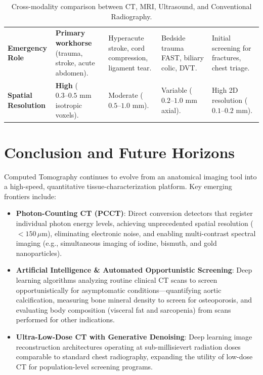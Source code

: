 \documentclass[11pt,a4paper]{article}
\begin{document}
\begin{table}[htbp]
\begin{tabular}{p{2.2cm}p{3.2cm}p{3.2cm}p{3.0cm}p{2.8cm}}
\textbf{Emergency Role} & \textbf{Primary workhorse} (trauma, stroke, acute abdomen). & Hyperacute stroke, cord compression, ligament tear. & Bedside trauma FAST, biliary colic, DVT. & Initial screening for fractures, chest triage. \\
\textbf{Spatial Resolution} & \textbf{High} ($0.3\text{--}0.5\text{ mm}$ isotropic voxels). & Moderate ($0.5\text{--}1.0\text{ mm}$). & Variable ($0.2\text{--}1.0\text{ mm}$ axial). & High 2D resolution ($0.1\text{--}0.2\text{ mm}$). \\
\bottomrule
\end{tabular}
\caption{Cross-modality comparison between CT, MRI, Ultrasound, and Conventional Radiography.}
\label{tab:modality_comparison}
\end{table}

\section{Conclusion and Future Horizons}

Computed Tomography continues to evolve from an anatomical imaging tool into a high-speed, quantitative tissue-characterization platform. Key emerging frontiers include:
\begin{itemize}[leftmargin=*]
    \item \textbf{Photon-Counting CT (PCCT)}: Direct conversion detectors that register individual photon energy levels, achieving unprecedented spatial resolution ($<150\,\mu\text{m}$), eliminating electronic noise, and enabling multi-contrast spectral imaging (e.g., simultaneous imaging of iodine, bismuth, and gold nanoparticles).
    \item \textbf{Artificial Intelligence \& Automated Opportunistic Screening}: Deep learning algorithms analyzing routine clinical CT scans to screen opportunistically for asymptomatic conditions—quantifying aortic calcification, measuring bone mineral density to screen for osteoporosis, and evaluating body composition (visceral fat and sarcopenia) from scans performed for other indications.
    \item \textbf{Ultra-Low-Dose CT with Generative Denoising}: Deep learning image reconstruction architectures operating at sub-millisievert radiation doses comparable to standard chest radiography, expanding the utility of low-dose CT for population-level screening programs.
\end{itemize}
\end{document}
